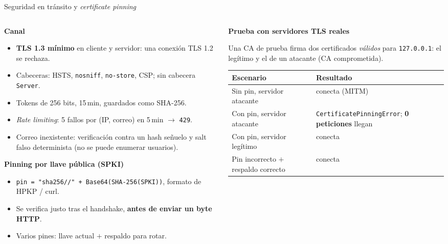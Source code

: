 \documentclass[aspectratio=169,10pt]{beamer}
\begin{document}
\begin{frame}{Seguridad en tránsito y \emph{certificate pinning}}
  \begin{columns}[T]
    \begin{column}{0.5\textwidth}
      \small
      \textbf{Canal}
      \begin{itemize}\footnotesize
        \item \textbf{TLS 1.3 mínimo} en cliente y servidor: una conexión TLS 1.2 se rechaza.
        \item Cabeceras: HSTS, \texttt{nosniff}, \texttt{no-store}, CSP; sin cabecera \texttt{Server}.
        \item Tokens de 256 bits, 15\,min, guardados como SHA-256.
        \item \emph{Rate limiting}: 5 fallos por (IP, correo) en 5\,min $\to$ \texttt{429}.
        \item Correo inexistente: verificación contra un hash señuelo y salt falso determinista
              (no se puede enumerar usuarios).
      \end{itemize}
      \vspace{1mm}
      \textbf{Pinning por llave pública (SPKI)}
      \begin{itemize}\footnotesize
        \item \texttt{pin = "sha256//" + Base64(SHA-256(SPKI))}, formato de HPKP / curl.
        \item Se verifica justo tras el handshake, \textbf{antes de enviar un byte HTTP}.
        \item Varios pines: llave actual $+$ respaldo para rotar.
      \end{itemize}
    \end{column}
    \begin{column}{0.48\textwidth}
      \scriptsize
      \textbf{Prueba con servidores TLS reales}
      \vspace{1mm}

      Una CA de prueba firma dos certificados \emph{válidos} para \texttt{127.0.0.1}:
      el legítimo y el de un atacante (CA comprometida).

      \vspace{1mm}
      \renewcommand{\arraystretch}{1.1}
      \begin{tabular}{@{}p{} p{}@{}}
        \toprule
        \textbf{Escenario} & \textbf{Resultado} \\
        \midrule
        Sin pin, servidor atacante & conecta (MITM) \\
        Con pin, servidor atacante & \texttt{CertificatePinningError}; \textbf{0 peticiones} llegan \\
        Con pin, servidor legítimo & conecta \\
        Pin incorrecto $+$ respaldo correcto & conecta \\
        \bottomrule
      \end{tabular}


\end{column}
\end{columns}
\end{frame}
\end{document}
